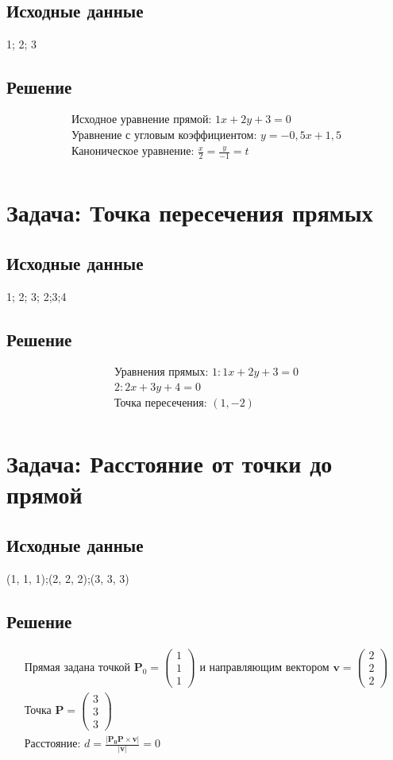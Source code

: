 \documentclass{article}
\begin{document}
\subsection{Исходные данные}
1; 2; 3
\subsection{Решение}
\begin{align*}
\text{Исходное уравнение прямой: }
1x + 2y + 3 = 0\\
\text{Уравнение с угловым коэффициентом: }
y = -0,5x +1,5\\
\text{Каноническое уравнение: }
\frac{x}{2} = \frac{y}{-1} = t\\
\end{align*}
\section{Задача: Точка пересечения прямых}
\subsection{Исходные данные}
1; 2; 3; 2;3;4
\subsection{Решение}
\begin{align*}
\text{Уравнения прямых: }
1: 1x + 2y + 3 = 0\\
2: 2x + 3y + 4 = 0\\
\text{Точка пересечения: }
\left(1, -2\right)\\
\end{align*}
\section{Задача: Расстояние от точки до прямой}
\subsection{Исходные данные}
(1, 1, 1);(2, 2, 2);(3, 3, 3)
\subsection{Решение}
\begin{align*}
\text{Прямая задана точкой } \mathbf{P}_0 = \begin{pmatrix}1 \\ 1 \\ 1\end{pmatrix} \text{ и направляющим вектором } \mathbf{v} = \begin{pmatrix}2 \\ 2 \\ 2\end{pmatrix}\\
\text{Точка } \mathbf{P} = \begin{pmatrix}3 \\ 3 \\ 3\end{pmatrix}\\
\text{Расстояние: }
d = \frac{|\mathbf{P_0P} \times \mathbf{v}|}{|\mathbf{v}|} = 0\\
\end{align*}
\end{document}
